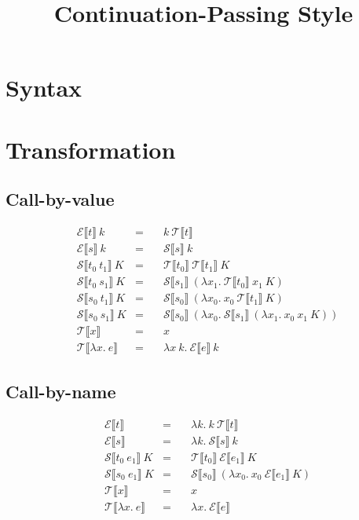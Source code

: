 
\usepackage{graphicx}
\usepackage{mdframed}
\usepackage{stmaryrd}

\newcommand\fun\lambda
\newcommand{\K}[1]{\llbracket #1\rrbracket}
\newcommand{\EK}[1]{\mathcal E\K{#1}}
\newcommand{\SK}[1]{\mathcal S\K{#1}}
\newcommand{\TK}[1]{\mathcal T\K{#1}}
\newcommand{\EDef}[2]{&\EK{#1}~k&=\quad&#2}
\newcommand{\Edef}[2]{&\EK{#1}&=\quad&#2}
\newcommand{\sdef}[2]{&\SK{#1}~K&=\quad&#2}
\newcommand{\tdef}[2]{&\TK{#1}&=\quad&#2}

\title{Continuation-Passing Style}
\date{}


\maketitle

\section*{Syntax}
\begin{figure}[h]
\begin{mdframed}
\ottmetavars

\ottgrammar
\end{mdframed}
\end{figure}

\section*{Transformation}
\subsection*{Call-by-value}
\begin{align*}
\EDef{t}{k~\TK{t}}\\
\EDef{s}{\SK{s}~k}\\
\sdef{t_0~t_1}{\TK{t_0}~\TK{t_1}~K}\\
\sdef{t_0~s_1}{\SK{s_1}~(\fun x_1.~\TK{t_0}~x_1~K)}\\
\sdef{s_0~t_1}{\SK{s_0}~(\fun x_0.~x_0~\TK{t_1}~K)}\\
\sdef{s_0~s_1}{\SK{s_0}~(\fun x_0.~\SK{s_1}~(\fun x_1.~x_0~x_1~K))}\\
\tdef{x}{x}\\
\tdef{\fun x.~e}{\fun x~k.~\EK{e}~k}
\end{align*}

\subsection*{Call-by-name}
\begin{align*}
\Edef{t}{\fun k.~k~\TK{t}}\\
\Edef{s}{\fun k.~\SK{s}~k}\\
\sdef{t_0~e_1}{\TK{t_0}~\EK{e_1}~K}\\
\sdef{s_0~e_1}{\SK{s_0}~(\fun x_0.~x_0~\EK{e_1}~K)}\\
\tdef{x}{x}\\
\tdef{\fun x.~e}{\fun x.~\EK{e}}
\end{align*}

